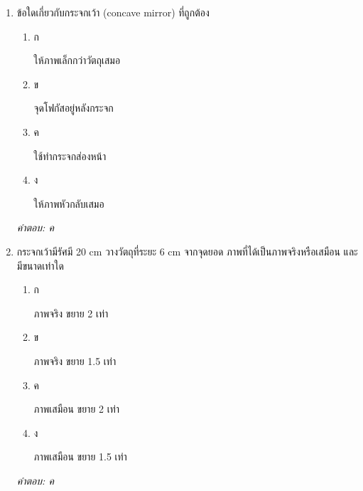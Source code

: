 \documentclass[12pt]{article}
\begin{document}
\begin{enumerate}[label=\arabic*., itemsep=0.5\baselineskip, topsep=0.5\baselineskip, leftmargin=*]
\item ข้อใดเกี่ยวกับกระจกเว้า (concave mirror) ที่ถูกต้อง
\begin{enumerate}[label=\alph*)., itemsep=0.3\baselineskip, topsep=0.3\baselineskip]
\item ก\ 
\begin{minipage}[t]{0.9\linewidth}
\raggedright ให้ภาพเล็กกว่าวัตถุเสมอ
\end{minipage}
\item ข\ 
\begin{minipage}[t]{0.9\linewidth}
\raggedright จุดโฟกัสอยู่หลังกระจก
\end{minipage}
\item ค\ 
\begin{minipage}[t]{0.9\linewidth}
\raggedright ใช้ทำกระจกส่องหน้า
\end{minipage}
\item ง\ 
\begin{minipage}[t]{0.9\linewidth}
\raggedright ให้ภาพหัวกลับเสมอ
\end{minipage}
\end{enumerate}
\vspace{-0.3\baselineskip}
\begin{small}
\textit{คำตอบ: ค}
\end{small}

\item กระจกเว้ามีรัศมี 20 cm วางวัตถุที่ระยะ 6 cm จากจุดยอด ภาพที่ได้เป็นภาพจริงหรือเสมือน และมีขนาดเท่าใด
\begin{enumerate}[label=\alph*)., itemsep=0.3\baselineskip, topsep=0.3\baselineskip]
\item ก\ 
\begin{minipage}[t]{0.9\linewidth}
\raggedright ภาพจริง ขยาย 2 เท่า
\end{minipage}
\item ข\ 
\begin{minipage}[t]{0.9\linewidth}
\raggedright ภาพจริง ขยาย 1.5 เท่า
\end{minipage}
\item ค\ 
\begin{minipage}[t]{0.9\linewidth}
\raggedright ภาพเสมือน ขยาย 2 เท่า
\end{minipage}
\item ง\ 
\begin{minipage}[t]{0.9\linewidth}
\raggedright ภาพเสมือน ขยาย 1.5 เท่า
\end{minipage}
\end{enumerate}
\vspace{-0.3\baselineskip}
\begin{small}
\textit{คำตอบ: ค}
\end{small}


\end{enumerate}
\end{document}
